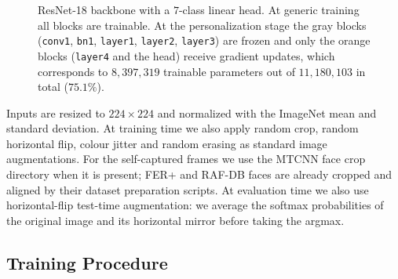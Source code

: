 \documentclass[12pt,a4paper]{article}
\begin{document}
\begin{figure}[H]
  \centering
  \caption{ResNet-18 backbone with a $7$-class linear head. At
  generic training all blocks are trainable. At the
  personalization stage the gray blocks
  (\texttt{conv1}, \texttt{bn1}, \texttt{layer1},
  \texttt{layer2}, \texttt{layer3}) are frozen and only the
  orange blocks (\texttt{layer4} and the head) receive gradient
  updates, which corresponds to $8{,}397{,}319$ trainable
  parameters out of $11{,}180{,}103$ in total ($75.1\%$).}
  \label{fig:arch}
\end{figure}

Inputs are resized to $224\times 224$ and normalized with the
ImageNet mean and standard deviation. At training time we also
apply random crop, random horizontal flip, colour jitter and
random erasing as standard image augmentations. For the
self-captured frames we use the MTCNN face crop directory when
it is present; FER+ and RAF-DB faces are already cropped and
aligned by their dataset preparation scripts. At evaluation
time we also use horizontal-flip test-time augmentation: we
average the softmax probabilities of the original image and
its horizontal mirror before taking the argmax.

\subsection{Training Procedure}
\label{sec:impl:training}
\end{document}
